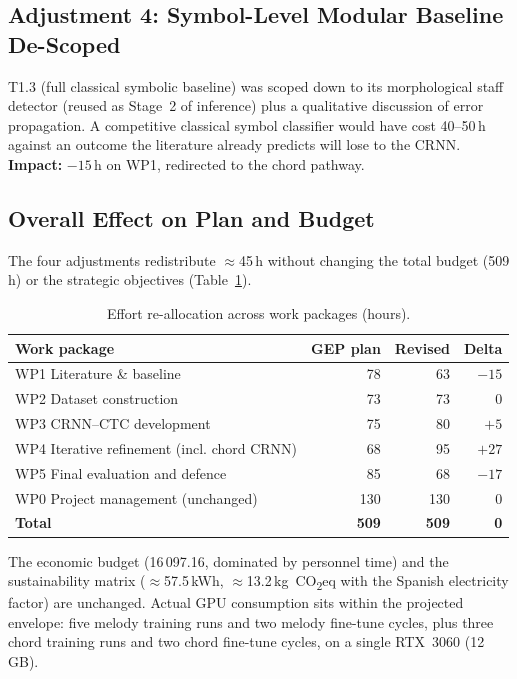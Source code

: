 \documentclass[11pt, a4paper]{article}
\begin{document}
\subsection{Adjustment 4: Symbol-Level Modular Baseline De-Scoped}
T1.3 (full classical symbolic baseline) was scoped down to its morphological staff detector (reused as Stage~2 of inference) plus a qualitative discussion of error propagation. A competitive classical symbol classifier would have cost 40--50\,h against an outcome the literature already predicts will lose to the CRNN. \textbf{Impact:} $-15$\,h on WP1, redirected to the chord pathway.

\subsection{Overall Effect on Plan and Budget}
The four adjustments redistribute $\approx$45\,h without changing the total budget (509\,h) or the strategic objectives (Table~\ref{tab:effort-deltas}).

\begin{table}[h!]
    \centering
    \caption{Effort re-allocation across work packages (hours).}
    \label{tab:effort-deltas}
    \renewcommand{\arraystretch}{1.15}
    \small
    \begin{tabularx}{\linewidth}{>{\raggedright\arraybackslash}p{6cm} r r r}
        \toprule
        \textbf{Work package} & \textbf{GEP plan} & \textbf{Revised} & \textbf{Delta} \\
        \midrule
        WP1 Literature \& baseline                  & 78  & 63  & $-15$ \\
        WP2 Dataset construction                    & 73  & 73  & $0$   \\
        WP3 CRNN--CTC development                   & 75  & 80  & $+5$  \\
        WP4 Iterative refinement (incl. chord CRNN) & 68  & 95  & $+27$ \\
        WP5 Final evaluation and defence            & 85  & 68  & $-17$ \\
        WP0 Project management (unchanged)          & 130 & 130 & $0$   \\
        \midrule
        \textbf{Total}                              & \textbf{509} & \textbf{509} & \textbf{0} \\
        \bottomrule
    \end{tabularx}
\end{table}

The economic budget (\EUR{}16\,097.16, dominated by personnel time) and the sustainability matrix ($\approx$57.5\,kWh, $\approx$13.2\,kg~CO\textsubscript{2}eq with the Spanish electricity factor) are unchanged. Actual GPU consumption sits within the projected envelope: five melody training runs and two melody fine-tune cycles, plus three chord training runs and two chord fine-tune cycles, on a single RTX~3060 (12\,GB).
\end{document}
